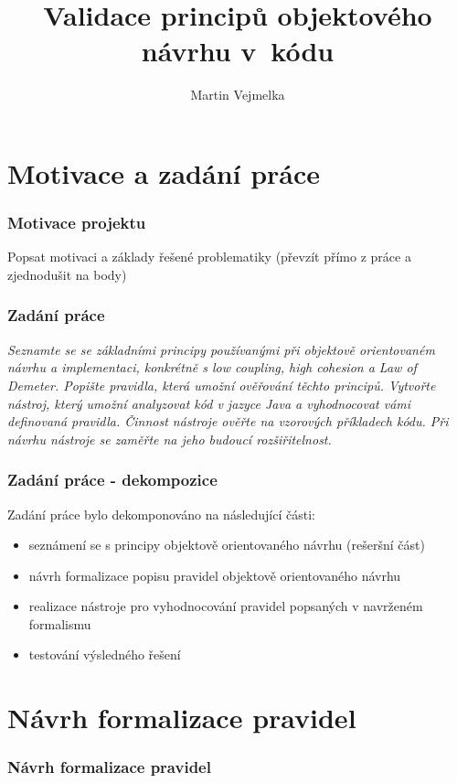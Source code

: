 \documentclass{beamer}
\title{Validace principů objektového návrhu v~kódu}
\author{Martin Vejmelka}
\begin{document}
\begin{frame}
  \titlepage
\end{frame}

\begin{frame}
  \tableofcontents
\end{frame}

\section{Motivace a zadání práce}
\begin{frame}
\frametitle{Motivace projektu}
    Popsat motivaci a základy řešené problematiky (převzít přímo z práce a zjednodušit na body)
\end{frame}

\begin{frame}
\frametitle{Zadání práce}
\textit{Seznamte se se základními principy používanými při objektově orientovaném návrhu a implementaci, konkrétně s low coupling, high cohesion a Law of Demeter. Popište pravidla, která umožní ověřování těchto principů. Vytvořte nástroj, který umožní analyzovat kód v jazyce Java a vyhodnocovat vámi definovaná pravidla. Činnost nástroje ověřte na vzorových příkladech kódu. Při návrhu nástroje se zaměřte na jeho budoucí rozšiřitelnost.}
\end{frame}

\begin{frame}
\frametitle{Zadání práce - dekompozice}
Zadání práce bylo dekomponováno na následující části:
\begin{itemize}
\item seznámení se s principy objektově orientovaného návrhu (rešeršní část)
\item návrh formalizace popisu pravidel objektově orientovaného návrhu
\item realizace nástroje pro vyhodnocování pravidel popsaných v navrženém formalismu
\item testování výsledného řešení
\end{itemize}
\end{frame}

\section{Návrh formalizace pravidel}
\begin{frame}
\frametitle{Návrh formalizace pravidel}
\end{frame}
\end{document}
